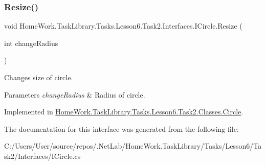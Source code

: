 \subsubsection{\texorpdfstring{Resize()}{Resize()}}
{\footnotesize\ttfamily void Home\+Work.\+Task\+Library.\+Tasks.\+Lesson6.\+Task2.\+Interfaces.\+I\+Circle.\+Resize (\begin{DoxyParamCaption}\item[{int}]{change\+Radius }\end{DoxyParamCaption})}



Changes size of circle. 


\begin{DoxyParams}{Parameters}
{\em change\+Radius} & Radius of circle.\\
\hline
\end{DoxyParams}


Implemented in \mbox{\hyperlink{class_home_work_1_1_task_library_1_1_tasks_1_1_lesson6_1_1_task2_1_1_classes_1_1_circle_ab541d3592fabffaa43fc67a88b23c20e}{Home\+Work.\+Task\+Library.\+Tasks.\+Lesson6.\+Task2.\+Classes.\+Circle}}.



The documentation for this interface was generated from the following file\+:\begin{DoxyCompactItemize}
\item 
C\+:/\+Users/\+User/source/repos/.\+Net\+Lab/\+Home\+Work.\+Task\+Library/\+Tasks/\+Lesson6/\+Task2/\+Interfaces/I\+Circle.\+cs\end{DoxyCompactItemize}
